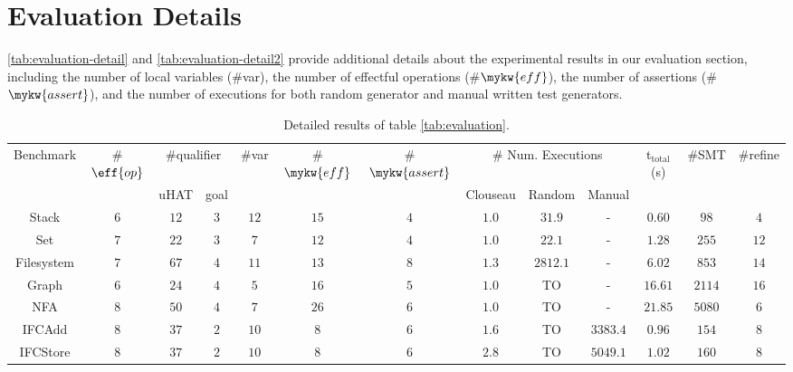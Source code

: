 \newpage
\section{Evaluation Details}\label{sec:tech:evaluation}

\autoref{tab:evaluation-detail} and \autoref{tab:evaluation-detail2}
provide additional details about the experimental results in our
evaluation section, including the number of local variables (\#var),
the number of effectful operations (\#$\mykw{eff}$), the number of
assertions (\#$\mykw{assert}$), and the number of executions for both
random generator and manual written test generators.

\begin{table}[t!]
  \renewcommand{\arraystretch}{0.8}
  \caption{\small Detailed results of table \ref{tab:evaluation}.}
\vspace*{-.1in}
\footnotesize
\setlength{\tabcolsep}{3.3pt}
\begin{tabular}{c||ccc||ccc||ccc||c|cc}
  \toprule
Benchmark & \#$\eff{op}$ & \multicolumn{2}{c||}{\#qualifier} & \#var &\#$\mykw{eff}$ & \#$\mykw{assert}$ & \multicolumn{3}{c||}{\scriptsize \# Num. Executions} & t$_\text{total}$(s) & \#SMT & \#refine  \\
 &  &uHAT &goal & & & & {\scriptsize Clouseau} & {\scriptsize Random} & {\scriptsize Manual} &  &  \\
 \midrule
 \textsf{Stack}\cite{ZYDJ24} & $6$ & $12$ & $3$ & $12$ & $15$ & $4$ & $1.0$ & $31.9$ & - & $0.60$ & $98$ & $4$\\
 \midrule
 \textsf{Set}\cite{ZYDJ24} & $7$ & $22$ & $3$ & $7$ & $12$ & $4$ & $1.0$ & $22.1$ & - & $1.28$ & $255$ & $12$\\
 \midrule
 \textsf{Filesystem}\cite{ZYDJ24} & $7$ & $67$ & $4$ & $11$ & $13$ & $8$ & $1.3$ & $2812.1$ & - & $6.02$ & $853$ & $14$\\
 \midrule
 \textsf{Graph}\cite{ZYDJ24} & $6$ & $24$ & $4$ & $5$ & $16$ & $5$ & $1.0$ & {\tiny TO} & - & $16.61$ & $2114$ & $16$\\
 \midrule
 \textsf{NFA}\cite{ZYDJ24} & $8$ & $50$ & $4$ & $7$ & $26$ & $6$ & $1.0$ & {\tiny TO} & - & $21.85$ & $5080$ & $6$\\
 \midrule
 \textsf{IFCAdd}\cite{pbt-ifc} & $8$ & $37$ & $2$ & $10$ & $8$ & $6$ & $1.6$ & {\tiny TO} & $3383.4$ & $0.96$ & $154$ & $8$\\
 \midrule
 \textsf{IFCStore}\cite{pbt-ifc} & $8$ & $37$ & $2$ & $10$ & $8$ & $6$ & $2.8$ & {\tiny TO} & $5049.1$ & $1.02$ & $160$ & $8$\\

\end{tabular}
\end{table}

